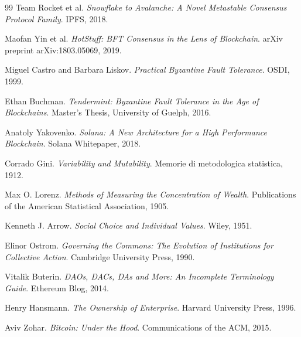 \begin{thebibliography}{99}
Team Rocket et al.
\textit{Snowflake to Avalanche: A Novel Metastable Consensus Protocol Family}.
IPFS, 2018.

Maofan Yin et al.
\textit{HotStuff: BFT Consensus in the Lens of Blockchain}.
arXiv preprint arXiv:1803.05069, 2019.

Miguel Castro and Barbara Liskov.
\textit{Practical Byzantine Fault Tolerance}.
OSDI, 1999.

Ethan Buchman.
\textit{Tendermint: Byzantine Fault Tolerance in the Age of Blockchains}.
Master's Thesis, University of Guelph, 2016.

Anatoly Yakovenko.
\textit{Solana: A New Architecture for a High Performance Blockchain}.
Solana Whitepaper, 2018.

Corrado Gini.
\textit{Variability and Mutability}.
Memorie di metodologica statistica, 1912.

Max O. Lorenz.
\textit{Methods of Measuring the Concentration of Wealth}.
Publications of the American Statistical Association, 1905.

Kenneth J. Arrow.
\textit{Social Choice and Individual Values}.
Wiley, 1951.

Elinor Ostrom.
\textit{Governing the Commons: The Evolution of Institutions for Collective Action}.
Cambridge University Press, 1990.

Vitalik Buterin.
\textit{DAOs, DACs, DAs and More: An Incomplete Terminology Guide}.
Ethereum Blog, 2014.

Henry Hansmann.
\textit{The Ownership of Enterprise}.
Harvard University Press, 1996.

Aviv Zohar.
\textit{Bitcoin: Under the Hood}.
Communications of the ACM, 2015.

\end{thebibliography}

\appendix

